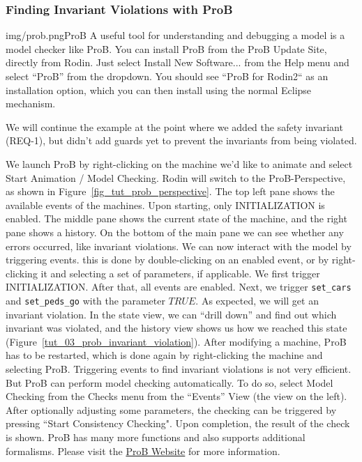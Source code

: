 
\subsubsection{Finding Invariant Violations with ProB}
\label{tut:prob}
\begin{rodin-plugin}{img/prob.png}{ProB}
A useful tool for understanding and debugging a model is a model checker like ProB. You can install ProB from the ProB Update Site, directly from Rodin.  Just select \textsf{Install New Software...} from the \textsf{Help} menu and select ``ProB'' from the dropdown. You should see ``ProB for Rodin2`` as an installation option, which you can then install using the normal Eclipse mechanism.

We will continue the example at the point where we added the safety invariant (REQ-1), but didn't add guards yet to prevent the invariants from being violated.

We launch ProB by right-clicking on the machine we'd like to animate and select \textsf{Start Animation / Model Checking}.  Rodin will switch to the ProB-Perspective, as shown in Figure~\ref{fig_tut_prob_perspective}. The top left pane shows the available events of the machines.  Upon starting, only INITIALIZATION is enabled.  The middle pane shows the current state of the machine, and the right pane shows a history.  On the bottom of the main pane we can see whether any errors occurred, like invariant violations. We can now interact with the model by triggering events.  this is done by double-clicking on an enabled event, or by right-clicking it and selecting a set of parameters, if applicable.  We first trigger INITIALIZATION.  After that, all events are enabled.  Next, we trigger \texttt{set\_cars} and \texttt{set\_peds\_go}  with the parameter $TRUE$.  As expected, we will get an invariant violation.  In the state view, we can ``drill down'' and find out which invariant was violated, and the history view shows us how we reached this state (Figure~\ref{tut_03_prob_invariant_violation}). After modifying a machine, ProB has to be restarted, which is done again by right-clicking the machine and selecting ProB.  Triggering events to find invariant violations is not very efficient.  But ProB can perform model checking automatically.  To do so, select \textsf{Model Checking} from the \textsf{Checks} menu from the ``Events'' View (the view on the left).  After optionally adjusting some parameters, the checking can be triggered by pressing ``Start Consistency Checking".  Upon completion, the result of the check is shown. ProB has many more functions and also supports additional formalisms. Please visit the \href{http://www.stups.uni-duesseldorf.de/ProB}{ProB Website} for more information.

\end{rodin-plugin}

